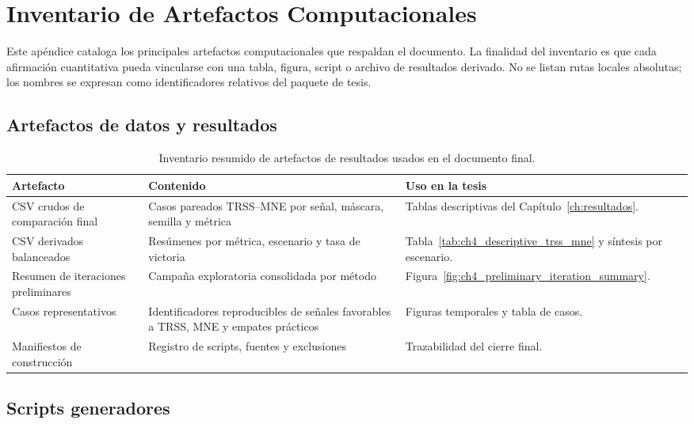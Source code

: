 \chapter{Inventario de Artefactos Computacionales}
\label{ap:inventario}

Este apéndice cataloga los principales artefactos computacionales que respaldan el documento. La finalidad del inventario es que cada afirmación cuantitativa pueda vincularse con una tabla, figura, script o archivo de resultados derivado. No se listan rutas locales absolutas; los nombres se expresan como identificadores relativos del paquete de tesis.

\section{Artefactos de datos y resultados}

\begin{table}[htbp]
\centering
\small
\caption{Inventario resumido de artefactos de resultados usados en el documento final.}
\label{tab:artifact_inventory_summary}
\begin{tabular}{@{}p{3.2cm}p{4.3cm}p{4.0cm}@{}}
\toprule
Artefacto & Contenido & Uso en la tesis \\
\midrule
CSV crudos de comparación final & Casos pareados TRSS--MNE por señal, máscara, semilla y métrica & Tablas descriptivas del Capítulo~\ref{ch:resultados}. \\
CSV derivados balanceados & Resúmenes por métrica, escenario y tasa de victoria & Tabla~\ref{tab:ch4_descriptive_trss_mne} y síntesis por escenario. \\
Resumen de iteraciones preliminares & Campaña exploratoria consolidada por método & Figura~\ref{fig:ch4_preliminary_iteration_summary}. \\
Casos representativos & Identificadores reproducibles de señales favorables a TRSS, MNE y empates prácticos & Figuras temporales y tabla de casos. \\
Manifiestos de construcción & Registro de scripts, fuentes y exclusiones & Trazabilidad del cierre final. \\
\bottomrule
\end{tabular}
\end{table}

\section{Scripts generadores}

